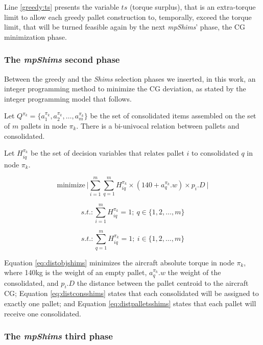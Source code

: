 \documentclass[preprint,authoryear]{elsarticle}
\begin{document}
Line \ref{greedy:ts} presents the variable $ts$ (torque surplus), that is an extra-torque limit to allow each greedy pallet construction to, temporally, exceed the torque limit, that will be turned feasible again by the next {\it mpShims}' phase, the CG minimization phase.


\subsubsection{The {\it mpShims} second phase}
\label{subsection:second_phase}

Between the greedy and the {\it Shims} selection phases we inserted, in this work, an integer programming method to minimize the CG deviation, as stated by the integer programming model that follows.

Let $Q^{\pi_k}  = \{ a^{\pi_k}_1, a^{\pi_k}_2, \ldots, a^{\pi_k}_m \}$ be the set of consolidated items assembled on the set of $m$ pallets in node $\pi_k$. There is a bi-univocal relation between pallets and consolidated.

Let $H^{\pi_k}_{iq}$ be the set of decision variables that relates pallet $i$ to consolidated $q$ in node $\pi_k$.

\begin{equation} \label{eq:distobjshims}
	\mbox{minimize}\ \Bigg |  \sum_{i=1}^{m} \sum_{q=1}^{m} H^{\pi_k}_{iq} \times  (140 + a^{\pi_k}_q.w) \times p_i.D\ \Bigg | 
\end{equation}

\begin{equation} \label{eq:distconsshims}
	s.t.: \sum_{i=1}^{m} H^{\pi_k}_{iq} = 1;\ q \in \{1,2,\ldots,m\}
\end{equation}

\begin{equation} \label{eq:distpalletsshims}
	s.t.: \sum_{q=1}^{m} H^{\pi_k}_{iq}=1;\ i \in \{1,2,\ldots,m\}
\end{equation}

Equation \ref{eq:distobjshims} minimizes the aircraft absolute torque in node $\pi_k$, where 140kg is the weight of an empty pallet, $a^{\pi_k}_q.w$ the weight of the consolidated, and $p_i.D$ the distance between the pallet centroid to the aircraft CG; Equation \ref{eq:distconsshims} states that each consolidated will be assigned to exactly one pallet; and Equation \ref{eq:distpalletsshims} states that each pallet will receive one consolidated.


\subsubsection{The {\it mpShims} third phase}
\end{document}
